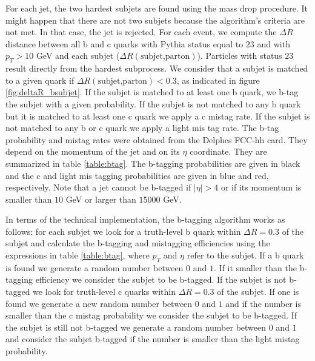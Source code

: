 For each jet, the two hardest subjets are found using the mass drop procedure. It might happen that there are not two subjets because the algorithm's criteria are not met. In that case, the jet is rejected. For each event, we compute the $\Delta R$ distance between all b and c quarks with Pythia status equal to $23$ \cite{Pythia6manual} and with $p_T>10$ GeV and each subjet ($\Delta R(\text{subjet,parton})$). Particles with status $23$ result directly from the hardest subprocess. We consider that a subjet is matched to a given quark if $\Delta R(\text{subjet,parton})<0.3$, as indicated in figure \ref{fig:deltaR_bsubjet}. If the subjet is matched to at least one b quark, we b-tag the subjet with a given probability. If the subjet is not matched to any b quark but it is matched to at least one c quark we apply a c mistag rate. If the subjet is not matched to any b or c quark we apply a light mis tag rate. The b-tag probability and mistag rates were obtained from the Delphes FCC-hh card. They depend on the momentum of the jet and on its $\eta$ coordinate. They are summarized in table \ref{table:btag}. The b-tagging probabilities are given in black and the c and light mis tagging probabilities are given in blue and red, respectively. Note that a jet cannot be b-tagged if $|\eta|>4$ or if its momentum is smaller than $10$ GeV or larger than $15000$ GeV.

In terms of the technical implementation, the b-tagging algorithm works as follows: for each subjet we look for a truth-level b quark within $\Delta R=0.3$ of the subjet and calculate the b-tagging and mistagging efficiencies using the expressions in table \ref{table:btag}, where $p_T$ and $\eta$ refer to the subjet. If a b quark is found we generate a random number between $0$ and $1$. If it smaller than the b-tagging efficiency we consider the subjet to be b-tagged. If the subjet is not b-tagged we look for truth-level c quarks within $\Delta R=0.3$ of the subjet. If one is found we generate a new random number between $0$ and $1$ and if the number is smaller than the c mistag probability we consider the subjet to be b-tagged. If the subjet is still not b-tagged we generate a random number between $0$ and $1$ and consider the subjet b-tagged if the number is smaller than the light mistag probability. 

